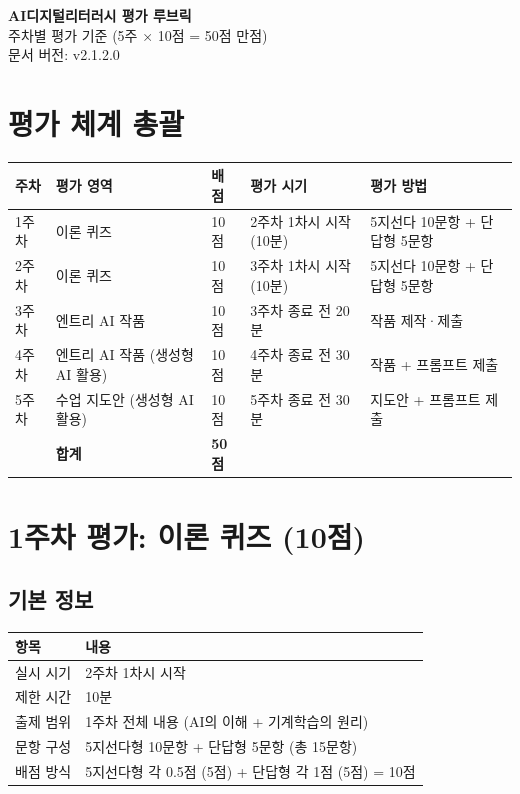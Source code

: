 \documentclass[a4paper,11pt]{ltjsarticle}
\begin{document}
\begin{center}
{\LARGE\bfseries AI디지털리터러시 평가 루브릭}\\[0.8em]
{\Large 주차별 평가 기준 (5주 × 10점 = 50점 만점)}\\[0.5em]
{\normalsize 문서 버전: v2.1.2.0}
\end{center}
\vspace{1em}
\tableofcontents
\newpage

\section{평가 체계 총괄}

\noindent
\begin{tabularx}{\textwidth}{|>{\centering\arraybackslash}p{1cm}|X|>{\centering\arraybackslash}p{1cm}|p{3.5cm}|X|}
\hline
\textbf{주차} & \textbf{평가 영역} & \textbf{배점} & \textbf{평가 시기} & \textbf{평가 방법} \\ \hline
1주차 & 이론 퀴즈 & 10점 & 2주차 1차시 시작 (10분) & 5지선다 10문항 + 단답형 5문항 \\ \hline
2주차 & 이론 퀴즈 & 10점 & 3주차 1차시 시작 (10분) & 5지선다 10문항 + 단답형 5문항 \\ \hline
3주차 & 엔트리 AI 작품 & 10점 & 3주차 종료 전 20분 & 작품 제작·제출 \\ \hline
4주차 & 엔트리 AI 작품 (생성형 AI 활용) & 10점 & 4주차 종료 전 30분 & 작품 + 프롬프트 제출 \\ \hline
5주차 & 수업 지도안 (생성형 AI 활용) & 10점 & 5주차 종료 전 30분 & 지도안 + 프롬프트 제출 \\ \hline
 & \textbf{합계} & \textbf{50점} & & \\ \hline
\end{tabularx}

\section{1주차 평가: 이론 퀴즈 (10점)}

\subsection{기본 정보}

\noindent
\begin{tabularx}{\textwidth}{|p{2.5cm}|X|}
\hline
\textbf{항목} & \textbf{내용} \\ \hline
실시 시기 & 2주차 1차시 시작 \\ \hline
제한 시간 & 10분 \\ \hline
출제 범위 & 1주차 전체 내용 (AI의 이해 + 기계학습의 원리) \\ \hline
문항 구성 & 5지선다형 10문항 + 단답형 5문항 (총 15문항) \\ \hline
배점 방식 & 5지선다형 각 0.5점 (5점) + 단답형 각 1점 (5점) = 10점 \\ \hline
\end{tabularx}
\end{document}

